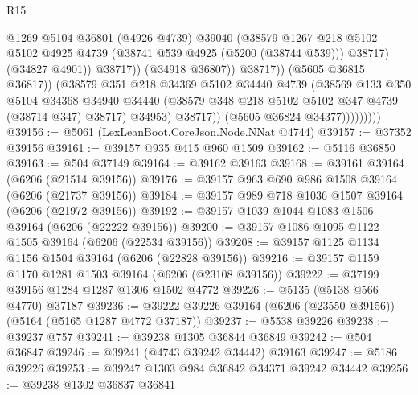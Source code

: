 \begin{lexlean}{R15}
\begin{coremodule}
{{{{{{{{{{{                                    @1269
                                    @5104
                                    @36801
                                    (@4926 @4739)
                                    @39040
                                    (@38579
                                      @1267
                                      @218
                                      @5102
                                      @5102
                                      @4925
                                      @4739
                                      (@38741 @539 @4925 (@5200 (@38744 @539)))
                                      @38717)
                                    (@34827 @4901))
                                  @38717))
                              (@34918 @36807))
                            @38717))
                        (@5605 @36815 @36817))
                      (@38579
                        @351
                        @218
                        @34369
                        @5102
                        @34440
                        @4739
                        (@38569
                          @133
                          @350
                          @5104
                          @34368
                          @34940
                          @34440
                          (@38579 @348 @218 @5102 @5102 @347 @4739 (@38714 @347) @38717)
                          @34953)
                        @38717))
                    (@5605 @36824 @34377)))))))))
@39156 := @5061 (LexLeanBoot.CoreJson.Node.NNat @4744)
@39157 := @37352 @39156
@39161 := @39157 @935 @415 @960 @1509
@39162 := @5116 @36850
@39163 := @504 @37149
@39164 := @39162 @39163
@39168 := @39161 @39164 (@6206 (@21514 @39156))
@39176 := @39157 @963 @690 @986 @1508 @39164 (@6206 (@21737 @39156))
@39184 := @39157 @989 @718 @1036 @1507 @39164 (@6206 (@21972 @39156))
@39192 := @39157 @1039 @1044 @1083 @1506 @39164 (@6206 (@22222 @39156))
@39200 := @39157 @1086 @1095 @1122 @1505 @39164 (@6206 (@22534 @39156))
@39208 := @39157 @1125 @1134 @1156 @1504 @39164 (@6206 (@22828 @39156))
@39216 := @39157 @1159 @1170 @1281 @1503 @39164 (@6206 (@23108 @39156))
@39222 := @37199 @39156 @1284 @1287 @1306 @1502 @4772
@39226 := @5135 (@5138 @566 @4770) @37187
@39236 := @39222 @39226 @39164 (@6206 (@23550 @39156)) (@5164 (@5165 @1287 @4772 @37187))
@39237 := @5538 @39226
@39238 := @39237 @757
@39241 := @39238 @1305 @36844 @36849
@39242 := @504 @36847
@39246 := @39241 (@4743 @39242 @34442) @39163
@39247 := @5186 @39226
@39253 := @39247 @1303 @984 @36842 @34371 @39242 @34442
@39256 := @39238 @1302 @36837 @36841
}}}}}}}}}}}
\end{coremodule}
\end{lexlean}
